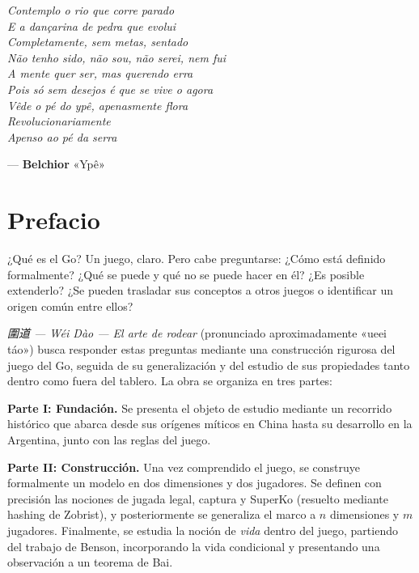 \begin{center}
	\begin{minipage}{6.375cm}
		\linespread{1.3}\selectfont
		\itshape
		Contemplo o rio que corre parado \\
		E a dançarina de pedra que evolui \\
		Completamente, sem metas, sentado \\
		Não tenho sido, não sou, não serei, nem fui \\
		A mente quer ser, mas querendo erra \\
		Pois só sem desejos é que se vive o agora\\
		Vêde o pé do ypê, apenasmente flora\\
		Revolucionariamente\\
		Apenso ao pé da serra
		
		\vspace{1.5em}
		\hfill \upshape  --- \textbf{Belchior} «Ypê»
	\end{minipage}
\end{center}
\vfill %
\clearpage
\thispagestyle{empty}
\section*{Prefacio}
\thispagestyle{empty}
¿Qué es el Go? Un juego, claro. Pero cabe preguntarse: ¿Cómo está definido formalmente? ¿Qué se puede y qué no se puede hacer en él? ¿Es posible extenderlo? ¿Se pueden trasladar sus conceptos a otros juegos o identificar un origen común entre ellos?

\textit{圍道 — Wéi Dào — El arte de rodear} (pronunciado aproximadamente «ueei táo») busca responder estas preguntas mediante una construcción rigurosa del juego del Go, seguida de su generalización y del estudio de sus propiedades tanto dentro como fuera del tablero. La obra se organiza en tres partes:

\textbf{Parte I: Fundación.} Se presenta el objeto de estudio mediante un recorrido histórico que abarca desde sus orígenes míticos en China hasta su desarrollo en la Argentina, junto con las reglas del juego.

\textbf{Parte II: Construcción.} Una vez comprendido el juego, se construye formalmente un modelo en dos dimensiones y dos jugadores. Se definen con precisión las nociones de jugada legal, captura y SuperKo (resuelto mediante hashing de Zobrist), y posteriormente se generaliza el marco a $n$ dimensiones y $m$ jugadores. Finalmente, se estudia la noción de \textit{vida} dentro del juego, partiendo del trabajo de Benson, incorporando la vida condicional y presentando una observación a un teorema de Bai.

